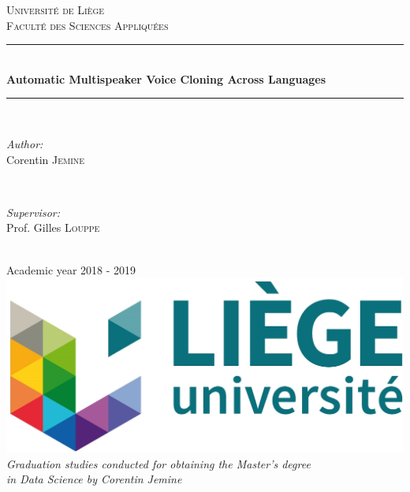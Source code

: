 \documentclass[a4paper, oneside]{article}
\begin{document}
\begin{titlepage}
	\newcommand{\HRule}{\rule{\linewidth}{0.5mm}}
	\center
	\textsc{\LARGE Université de Liège}\\[1cm]
	\textsc{\Large Faculté des Sciences Appliquées}\\[2cm]
		
	\HRule \\[0.5cm]
	{ \huge \bfseries Automatic Multispeaker Voice Cloning Across Languages}\\[0.2cm]
	\HRule \\[3cm]

	\begin{minipage}{0.4\textwidth}
		\begin{flushleft} \Large
			\emph{Author:}\\
			Corentin \textsc{Jemine}
		\end{flushleft}
	\end{minipage}
	~
	\begin{minipage}{0.4\textwidth}
		\begin{flushright} \Large
			\emph{Supervisor:} \\
			Prof. Gilles \textsc{Louppe}
		\end{flushright}
	\end{minipage}\\[4cm]
	
	{\LARGE Academic year 2018 - 2019}\\[2cm]
	
	\includegraphics{images/uliege_logo.jpg}\\[1.25cm]
	
	\textit{Graduation studies conducted for obtaining the Master's degree \\in Data Science by Corentin Jemine}
	
	\vfill
\end{titlepage}

\setcounter{page}{2}
\end{document}
